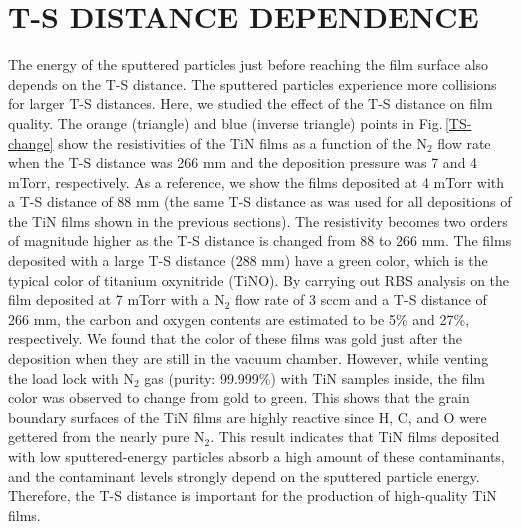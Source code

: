 \section{T-S DISTANCE DEPENDENCE}
\label{T-S DISTANCE DEPENDENCE}
The energy of the sputtered particles just before reaching the film surface also depends on the T-S distance. The sputtered particles experience more collisions for larger T-S distances. Here, we studied the effect of the T-S distance on film quality. The orange (triangle) and blue (inverse triangle) points in Fig.\,\ref{TS-change} show the resistivities of the TiN films as a function of the N$_{2}$ flow rate when the T-S distance was 266 mm and the deposition pressure was 7 and 4 mTorr, respectively. As a reference, we show the films deposited at 4 mTorr with a T-S distance of 88 mm (the same T-S distance as was used for all depositions of the TiN films shown in the previous sections). The resistivity becomes two orders of magnitude higher as the T-S distance is changed from 88 to 266 mm. The films deposited with a large T-S distance (288 mm) have a green color, which is the typical color of titanium oxynitride (TiNO). By carrying out RBS analysis on the film deposited at 7 mTorr with a N$_{2}$ flow rate of 3 sccm and a T-S distance of 266 mm, the carbon and oxygen contents are estimated to be 5\% and 27\%, respectively. We found that the color of these films was gold just after the deposition when they are still in the vacuum chamber. However, while venting the load lock with N$_{2}$ gas (purity: 99.999\%) with TiN samples inside, the film color was observed to change from gold to green.  This shows that the grain boundary surfaces of the TiN films are highly reactive since H, C, and O were gettered from the nearly pure N$_{2}$. This result indicates that TiN films deposited with low sputtered-energy particles absorb a high amount of these contaminants, and the contaminant levels strongly depend on the sputtered particle energy. Therefore, the T-S distance is important for the production of high-quality TiN films.\cite{T-SComment}
